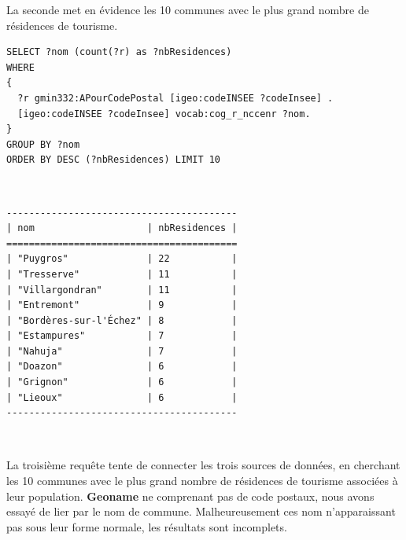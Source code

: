 \documentclass{article}
\newenvironment{DDbox}[1]{
	\begin{lrbox}{\BBbox}\begin{minipage}{\linewidth}}
		{\end{minipage}\end{lrbox}\noindent\colorbox{Zgris}{\usebox{\BBbox}} \\
		[.5cm]}
\begin{document}
La seconde met en évidence les 10 communes avec le plus grand nombre de résidences de tourisme.
\medskip
\begin{DDbox}{\linewidth}
	\begin{Verbatim}
SELECT ?nom (count(?r) as ?nbResidences)
WHERE
{
  ?r gmin332:APourCodePostal [igeo:codeINSEE ?codeInsee] .
  [igeo:codeINSEE ?codeInsee] vocab:cog_r_nccenr ?nom.
}
GROUP BY ?nom
ORDER BY DESC (?nbResidences) LIMIT 10
\end{Verbatim}
\end{DDbox}

\begin{DDbox}{\linewidth}
	\begin{Verbatim}
-----------------------------------------
| nom                    | nbResidences |
=========================================
| "Puygros"              | 22           |
| "Tresserve"            | 11           |
| "Villargondran"        | 11           |
| "Entremont"            | 9            |
| "Bordères-sur-l'Échez" | 8            |
| "Estampures"           | 7            |
| "Nahuja"               | 7            |
| "Doazon"               | 6            |
| "Grignon"              | 6            |
| "Lieoux"               | 6            |
-----------------------------------------
\end{Verbatim}
\end{DDbox}

La troisième requête tente de connecter les trois sources de données, en cherchant les 10 communes avec le plus grand nombre
de résidences de tourisme associées à leur population. 
\textbf{Geoname}  ne comprenant pas de code postaux, nous avons essayé de lier par le nom de commune. Malheureusement ces nom n'apparaissant pas sous leur
forme normale, les résultats sont incomplets.
\end{document}
